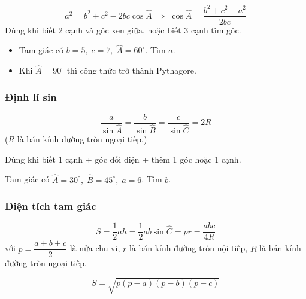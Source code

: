 \documentclass[12pt,a4paper]{article}
\begin{document}
\begin{dinhly}[title={Định lý cosin}]
  \[
    a^2 = b^2 + c^2 - 2bc\cos\widehat{A}
    \;\Rightarrow\;
    \cos\widehat{A} = \dfrac{b^2 + c^2 - a^2}{2bc}
  \]
  Dùng khi biết 2 cạnh và góc xen giữa, hoặc biết 3 cạnh tìm góc.
\end{dinhly}

\begin{vidu}
  \begin{itemize}
    \item Tam giác có $b = 5,\; c = 7,\; \widehat{A} = 60^\circ$. Tìm $a$.
    \item Khi $\widehat{A} = 90^\circ$ thì công thức trở thành Pythagore.
  \end{itemize}
\end{vidu}

\subsubsection{Định lí sin}

\begin{dinhly}[title={Định lý sin}]
  \[
    \dfrac{a}{\sin\widehat{A}} = \dfrac{b}{\sin\widehat{B}} = \dfrac{c}{\sin\widehat{C}} = 2R
  \]
  ($R$ là bán kính đường tròn ngoại tiếp.)

  Dùng khi biết 1 cạnh + góc đối diện + thêm 1 góc hoặc 1 cạnh.
\end{dinhly}

\begin{vidu}
  Tam giác có $\widehat{A} = 30^\circ,\; \widehat{B} = 45^\circ,\; a = 6$. Tìm $b$.
\end{vidu}

\subsubsection{Diện tích tam giác}

\begin{congthuc}[title={Diện tích tam giác}]
  \[
    S = \dfrac{1}{2}ah = \dfrac{1}{2}ab\sin\widehat{C} = pr = \dfrac{abc}{4R}
  \]
  với $p = \dfrac{a + b + c}{2}$ là nửa chu vi, $r$ là bán kính đường tròn nội tiếp, $R$ là bán kính đường tròn ngoại tiếp.
\end{congthuc}

\begin{congthuc}[title={Công thức Heron}]
  \[
    S = \sqrt{p(p - a)(p - b)(p - c)}
  \]
\end{congthuc}
\end{document}
